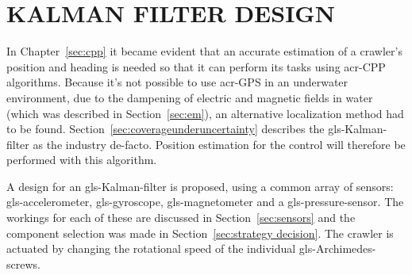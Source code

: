 \section{KALMAN FILTER DESIGN}\label{sec:kalman design}

In Chapter~\ref{sec:cpp} it became evident that an accurate estimation of a crawler's position and heading is needed
so that it can perform its tasks using \gls{acr-CPP} algorithms. Because it's not possible to use \gls{acr-GPS} in an
underwater environment, due to the dampening of electric and magnetic fields in water (which was described in
Section~\ref{sec:em}), an alternative localization method had to be found. Section~\ref{sec:coverageunderuncertainty}
describes the \gls{gls-Kalman-filter} as the industry de-facto. Position estimation for the control will therefore be
performed with this algorithm.

A design for an \gls{gls-Kalman-filter} is proposed, using a common array of sensors: \gls{gls-accelerometer},
\gls{gls-gyroscope}, \gls{gls-magnetometer} and a \gls{gls-pressure-sensor}. The workings for each of these are
discussed in Section~\ref{sec:sensors} and the component selection was made in Section~\ref{sec:strategy decision}. The
crawler is actuated by changing the rotational speed of the individual \gls{gls-Archimedes-screw}s.

